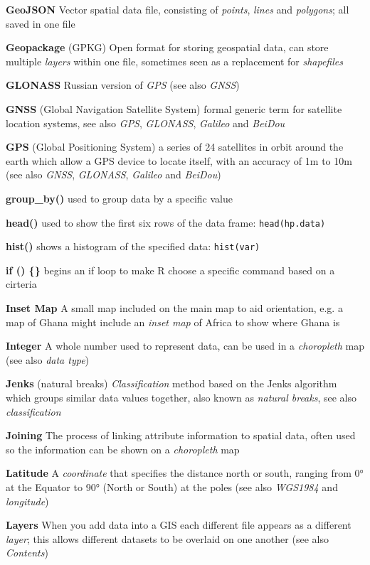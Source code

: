 \documentclass[a4paper,10pt]{article}
\begin{document}
\begin{multicols}{2}
\textbf{GeoJSON} Vector spatial data file, consisting of \textit{points}, \textit{lines} and \textit{polygons}; all saved in one file

\textbf{Geopackage} (GPKG) Open format for storing geospatial data, can store multiple \textit{layers} within one file, sometimes seen as a replacement for \textit{shapefiles}

\textbf{GLONASS} Russian version of \textit{GPS} (see also \textit{GNSS})

\textbf{GNSS} (Global Navigation Satellite System) formal generic term for satellite location systems, see also \textit{GPS}, \textit{GLONASS}, \textit{Galileo} and \textit{BeiDou}

\textbf{GPS} (Global Positioning System) a series of 24 satellites in orbit around the earth which allow a GPS device to locate itself, with an accuracy of 1m to 10m  (see also \textit{GNSS}, \textit{GLONASS}, \textit{Galileo} and \textit{BeiDou})

\textbf{group\_by()} used to group data by a specific value

\textbf{head()} used to show the first six rows of the data frame: \texttt{head(hp.data)}

\textbf{hist()} shows a histogram of the specified data: \texttt{hist(var)}

\textbf{if () \{\} } begins an if loop to make R choose a specific command based on a cirteria

\textbf{Inset Map} A small map included on the main map to aid orientation, e.g. a map of Ghana might include an \textit{inset map} of Africa to show where Ghana is

\textbf{Integer} A whole number used to represent data, can be used in a \textit{choropleth} map (see also \textit{data type}) 

\textbf{Jenks} (natural breaks) \textit{Classification} method based on the Jenks algorithm which groups similar data values together, also known as \textit{natural breaks}, see also \textit{classification}

\textbf{Joining} The process of linking attribute information to spatial data, often used so the information can be shown on a \textit{choropleth} map 

\textbf{Latitude} A \textit{coordinate} that specifies the distance north or south, ranging from \ang{0} at the Equator to \ang{90} (North or South) at the poles (see also \textit{WGS1984} and \textit {longitude})

\textbf{Layers} When you add data into a GIS each different file appears as a different \textit{layer}; this allows different datasets to be overlaid on one another (see also \textit{Contents})


\end{multicols}
\end{document}
